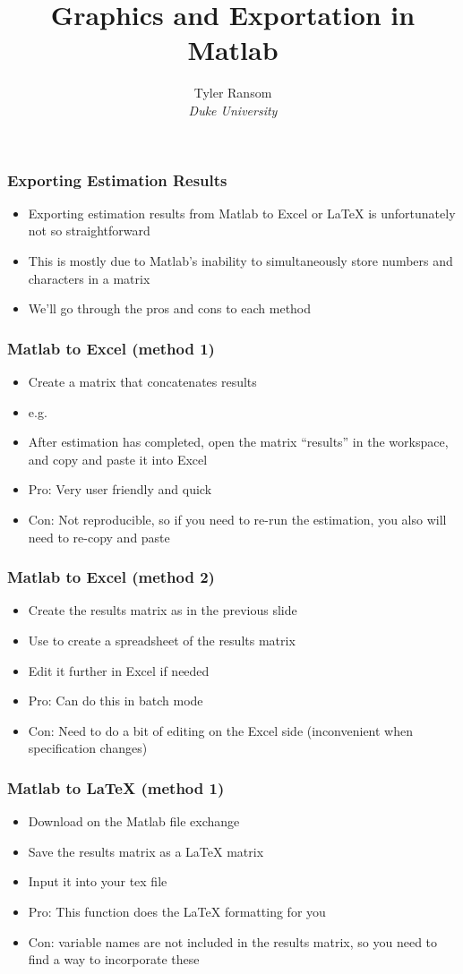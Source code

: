 \documentclass[english,xcolor=dvipsnames]{beamer}
\newcommand{\bi}{\begin{itemize}}
\newcommand{\ei}{\end{itemize}}
\begin{document}
\begin{frame}
\title{Graphics and Exportation in Matlab}
\author{
	Tyler Ransom\\
	\emph{Duke University}\\
}
\titlepage
\end{frame}

\begin{frame}
\frametitle{Exporting Estimation Results}
   \bi 
   \item Exporting estimation results from Matlab to Excel or LaTeX is unfortunately not so straightforward
   \item This is mostly due to Matlab's inability to simultaneously store numbers and characters in a matrix
   \item We'll go through the pros and cons to each method
   \ei
\end{frame}

\begin{frame}
\frametitle{Matlab to Excel (method 1)}
   \bi 
   \item Create a matrix that concatenates results
   \item e.g. 
   \item After estimation has completed, open the matrix ``results'' in the workspace, and copy and paste it into Excel
   \item Pro: Very user friendly and quick
   \item Con: Not reproducible, so if you need to re-run the estimation, you also will need to re-copy and paste
   \ei
\end{frame}

\begin{frame}
\frametitle{Matlab to Excel (method 2)}
   \bi 
   \item Create the results matrix as in the previous slide
   \item Use  to create a spreadsheet of the results matrix
   \item Edit it further in Excel if needed
   \item Pro: Can do this in batch mode
   \item Con: Need to do a bit of editing on the Excel side (inconvenient when specification changes)
   \ei
\end{frame}

\begin{frame}
\frametitle{Matlab to LaTeX (method 1)}
   \bi 
   \item Download  on the Matlab file exchange
   \item Save the results matrix as a LaTeX matrix
   \item Input it into your tex file
   \item Pro: This function does the LaTeX formatting for you
   \item Con: variable names are not included in the results matrix, so you need to find a way to incorporate these
   \ei
\end{frame}
\end{document}
